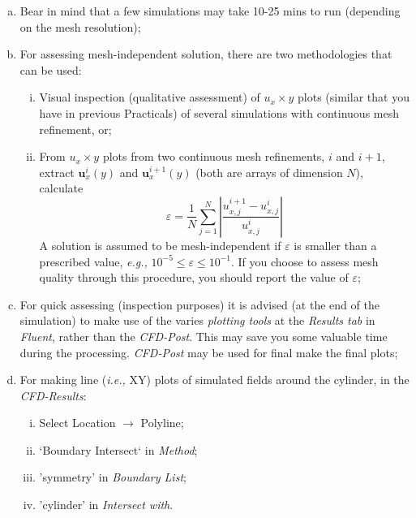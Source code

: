 \documentclass[12pts,a4paper,amsmath,amssymb,floatfix]{article}%
\newcommand{\eg}{{\it e.g., }}
\newcommand{\ie}{{\it i.e., }}
\begin{document}
\begin{shaded}
\begin{enumerate}[a)]
             \item Bear in mind that a few simulations may take 10-25 mins to run (depending on the mesh resolution);
             \item For assessing mesh-independent solution, there are two methodologies that can be used:
                 \begin{enumerate}[i)]
                    \item Visual inspection (qualitative assessment) of $u_{x}\times y$ plots (similar that you have in previous Practicals) of several simulations with continuous mesh refinement, or;
                    \item From $u_{x}\times y$ plots from two continuous mesh refinements, $i$ and $i+1$, extract $\mathbf{u}_{x}^{i}(y)$ and $\mathbf{u}_{x}^{i+1}(y)$ (both are arrays of dimension $N$), calculate
                      \begin{displaymath}
                           \varepsilon = \frac{1}{N}\sum\limits_{j=1}^{N}\left|\frac{u_{x,j}^{i+1}-u_{x,j}^{i}}{u_{x,j}^{i}}\right|
                      \end{displaymath}
                      A solution is assumed to be mesh-independent if $\varepsilon$ is smaller than a prescribed value, \eg $10^{-5} \le \varepsilon \le 10^{-1}$. If you choose to assess mesh quality through this procedure, you should report the value of $\varepsilon$;
                 \end{enumerate}
               \item For quick assessing (inspection purposes) it is advised (at the end of the simulation) to make use of the varies {\it plotting tools} at the {\it Results tab} in {\it Fluent}, rather than the {\it CFD-Post}. This may save you some valuable time during the processing. {\it CFD-Post} may be used for final make the final plots;
               \item For making line (\ie XY) plots of simulated fields around the cylinder, in the {\it CFD-Results}:
                 \begin{enumerate}[i)]
                    \item Select Location $\rightarrow$ Polyline;
                    \item `Boundary Intersect` in {\it Method};
                    \item 'symmetry' in {\it Boundary List};
                    \item 'cylinder' in {\it Intersect with}.
                 \end{enumerate}
        \end{enumerate}
     \end{shaded}
\end{document}
